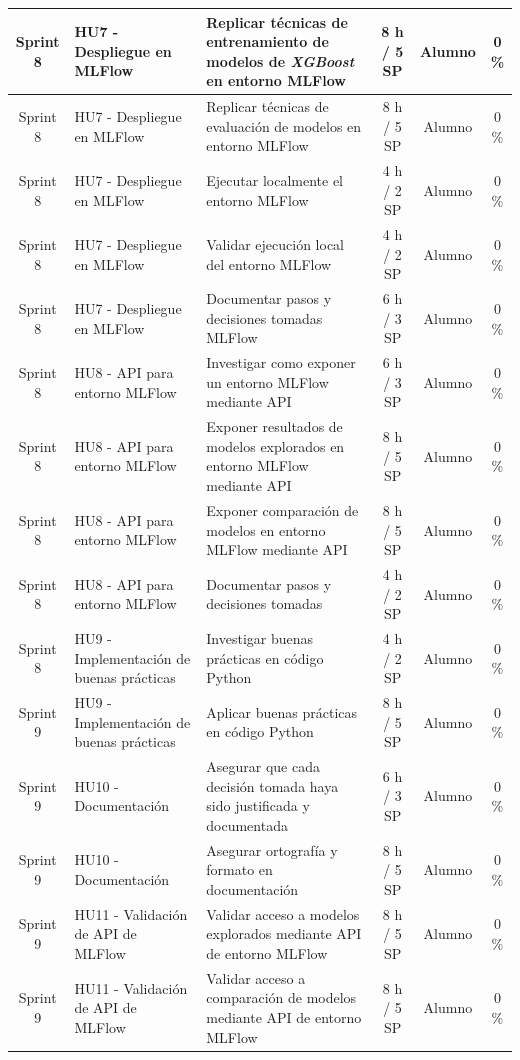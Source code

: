 \documentclass[
11pt, %
]{charter}
\begin{document}
\begin{xltabular}{\linewidth}{@{}|c|X|X|c|c|c|@{}}
Sprint 8 & HU7 - Despliegue en MLFlow  & Replicar técnicas de entrenamiento de modelos de \textit{XGBoost} en entorno MLFlow  & 8 h / 5 SP & Alumno & 0 \%\\ \hline
Sprint 8 & HU7 - Despliegue en MLFlow  & Replicar técnicas de evaluación de modelos en entorno MLFlow  & 8 h / 5 SP & Alumno & 0 \%\\ \hline
Sprint 8 & HU7 - Despliegue en MLFlow  & Ejecutar localmente el entorno MLFlow  & 4 h / 2 SP & Alumno & 0 \% \\ \hline
Sprint 8 & HU7 - Despliegue en MLFlow  & Validar ejecución local del entorno MLFlow  & 4 h / 2 SP & Alumno & 0 \% \\ \hline
Sprint 8 & HU7 - Despliegue en MLFlow  & Documentar pasos y decisiones tomadas MLFlow  & 6 h / 3 SP & Alumno & 0 \% \\ \hline
Sprint 8 & HU8 - API para entorno MLFlow & Investigar como exponer un entorno MLFlow mediante API  & 6 h / 3 SP & Alumno & 0 \% \\ \hline
Sprint 8 & HU8 - API para entorno MLFlow & Exponer resultados de modelos explorados en entorno MLFlow mediante API  & 8 h / 5 SP & Alumno & 0 \%\\ \hline
Sprint 8 & HU8 - API para entorno MLFlow & Exponer comparación de modelos en entorno MLFlow mediante API  & 8 h / 5 SP & Alumno & 0 \%\\ \hline
Sprint 8 & HU8 - API para entorno MLFlow & Documentar pasos y decisiones tomadas  & 4 h / 2 SP & Alumno & 0 \%\\ \hline
Sprint 8 & HU9 - Implementación de buenas prácticas  & Investigar buenas prácticas en código Python  & 4 h / 2 SP & Alumno & 0 \%\\ \hline
Sprint 9 & HU9 - Implementación de buenas prácticas  & Aplicar buenas prácticas en código Python  & 8 h / 5 SP & Alumno & 0 \% \\ \hline
Sprint 9 & HU10 - Documentación  & Asegurar que cada decisión tomada haya sido justificada y documentada  & 6 h / 3 SP & Alumno & 0 \% \\ \hline
Sprint 9 & HU10 - Documentación  & Asegurar ortografía y formato en documentación  & 8 h / 5 SP & Alumno & 0 \% \\ \hline
Sprint 9 & HU11 - Validación de API de MLFlow & Validar acceso a modelos explorados mediante API de entorno MLFlow  & 8 h / 5 SP & Alumno & 0 \% \\ \hline
Sprint 9 & HU11 - Validación de API de MLFlow & Validar acceso a comparación de modelos mediante API de entorno MLFlow  & 8 h / 5 SP & Alumno & 0 \% \\ \hline

\end{xltabular}
\end{document}
